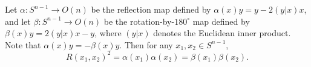 Let $\alpha: S^{n-1} \to O(n)$ be the reflection map defined by $\alpha(x)y = y - 2(y|x)x$, and let $\beta: S^{n-1} \to O(n)$ be the rotation-by-$180^\circ$ map defined by $\beta(x)y = 2(y|x)x - y$, where $(y|x)$ denotes the Euclidean inner product. Note that $\alpha(x)y = -\beta(x)y$. Then for any $x_1, x_2 \in S^{n-1}$,
$$R(x_1, x_2)^2 = \alpha(x_1)\alpha(x_2) = \beta(x_1)\beta(x_2).$$
